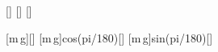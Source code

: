 [\mpss]
[\kg]
[\degree]

[m\,g]{\mKiX*\gEX}[\newton]
[m\,g\cos\alpha]{\mKiX*\gEX*cos(\wiX*pi/180)}[\newton]
[m\,g\sin\alpha]{\mKiX*\gEX*sin(\wiX*pi/180)}[\newton]
